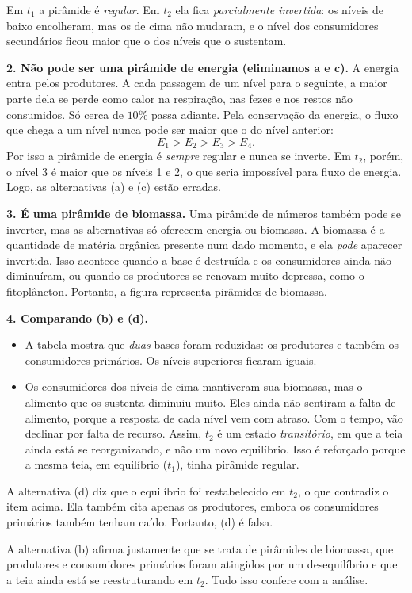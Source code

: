 \documentclass{article}%
\begin{document}
Em $t_1$ a pirâmide é \emph{regular}. Em $t_2$ ela fica \emph{parcialmente invertida}: os níveis de baixo encolheram, mas os de cima não mudaram, e o nível dos consumidores secundários ficou maior que o dos níveis que o sustentam.

\textbf{2. Não pode ser uma pirâmide de energia (eliminamos a e c).} A energia entra pelos produtores. A cada passagem de um nível para o seguinte, a maior parte dela se perde como calor na respiração, nas fezes e nos restos não consumidos. Só cerca de $10\%$ passa adiante. Pela conservação da energia, o fluxo que chega a um nível nunca pode ser maior que o do nível anterior:
\[
E_1 > E_2 > E_3 > E_4 .
\]
Por isso a pirâmide de energia é \emph{sempre} regular e nunca se inverte. Em $t_2$, porém, o nível 3 é maior que os níveis 1 e 2, o que seria impossível para fluxo de energia. Logo, as alternativas (a) e (c) estão erradas.

\textbf{3. É uma pirâmide de biomassa.} Uma pirâmide de números também pode se inverter, mas as alternativas só oferecem energia ou biomassa. A biomassa é a quantidade de matéria orgânica presente num dado momento, e ela \emph{pode} aparecer invertida. Isso acontece quando a base é destruída e os consumidores ainda não diminuíram, ou quando os produtores se renovam muito depressa, como o fitoplâncton. Portanto, a figura representa pirâmides de biomassa.

\textbf{4. Comparando (b) e (d).}
\begin{itemize}
\item A tabela mostra que \emph{duas} bases foram reduzidas: os produtores e também os consumidores primários. Os níveis superiores ficaram iguais.
\item Os consumidores dos níveis de cima mantiveram sua biomassa, mas o alimento que os sustenta diminuiu muito. Eles ainda não sentiram a falta de alimento, porque a resposta de cada nível vem com atraso. Com o tempo, vão declinar por falta de recurso. Assim, $t_2$ é um estado \emph{transitório}, em que a teia ainda está se reorganizando, e não um novo equilíbrio. Isso é reforçado porque a mesma teia, em equilíbrio ($t_1$), tinha pirâmide regular.
\end{itemize}

A alternativa (d) diz que o equilíbrio foi restabelecido em $t_2$, o que contradiz o item acima. Ela também cita apenas os produtores, embora os consumidores primários também tenham caído. Portanto, (d) é falsa.

A alternativa (b) afirma justamente que se trata de pirâmides de biomassa, que produtores e consumidores primários foram atingidos por um desequilíbrio e que a teia ainda está se reestruturando em $t_2$. Tudo isso confere com a análise.
\end{document}
